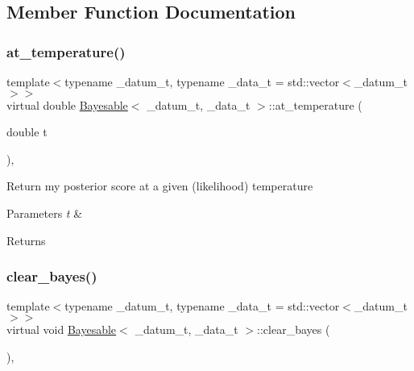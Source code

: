 \subsection{Member Function Documentation}
\mbox{\label{class_bayesable_acf805473a9eea0df96d6267dca0e9c87}} 
\subsubsection{\texorpdfstring{at\+\_\+temperature()}{at\_temperature()}}
{\footnotesize\ttfamily template$<$typename \+\_\+datum\+\_\+t, typename \+\_\+data\+\_\+t = std\+::vector$<$\+\_\+datum\+\_\+t$>$$>$ \\
virtual double \hyperlink{class_bayesable}{Bayesable}$<$ \+\_\+datum\+\_\+t, \+\_\+data\+\_\+t $>$\+::at\+\_\+temperature (\begin{DoxyParamCaption}\item[{double}]{t }\end{DoxyParamCaption})\hspace{0.3cm}{\ttfamily [inline]}, {\ttfamily [virtual]}}

Return my posterior score at a given (likelihood) temperature 
\begin{DoxyParams}{Parameters}
{\em t} & \\
\hline
\end{DoxyParams}
\begin{DoxyReturn}{Returns}

\end{DoxyReturn}
\mbox{\label{class_bayesable_ac8ab4bb38c8782d2dcd57f3a43a3c605}} 
\subsubsection{\texorpdfstring{clear\+\_\+bayes()}{clear\_bayes()}}
{\footnotesize\ttfamily template$<$typename \+\_\+datum\+\_\+t, typename \+\_\+data\+\_\+t = std\+::vector$<$\+\_\+datum\+\_\+t$>$$>$ \\
virtual void \hyperlink{class_bayesable}{Bayesable}$<$ \+\_\+datum\+\_\+t, \+\_\+data\+\_\+t $>$\+::clear\+\_\+bayes (\begin{DoxyParamCaption}{ }\end{DoxyParamCaption})\hspace{0.3cm}{\ttfamily [inline]}, {\ttfamily [virtual]}}

